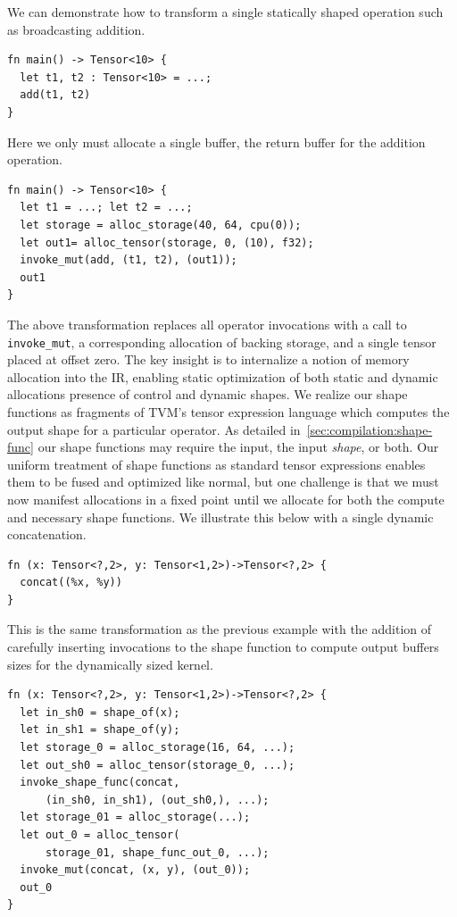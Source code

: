 We can demonstrate how to transform a single statically shaped operation such as broadcasting addition.

\begin{verbatim}
fn main() -> Tensor<10> {
  let t1, t2 : Tensor<10> = ...;
  add(t1, t2)
}
\end{verbatim}

Here we only must allocate a single buffer, the return buffer for the addition operation.

\begin{verbatim}
fn main() -> Tensor<10> {
  let t1 = ...; let t2 = ...;
  let storage = alloc_storage(40, 64, cpu(0));
  let out1= alloc_tensor(storage, 0, (10), f32);
  invoke_mut(add, (t1, t2), (out1));
  out1
}
\end{verbatim}

The above transformation replaces all operator invocations with a call to
  \verb|invoke_mut|, a corresponding allocation of backing storage, and a single
  tensor placed at offset zero.
The key insight is to internalize a notion of memory allocation into the IR,
  enabling static optimization of both static and dynamic allocations presence of
  control and dynamic shapes.
We realize our shape functions as fragments of TVM's tensor expression language
  which computes the output shape for a particular operator.
As detailed in~\autoref{sec:compilation:shape-func} our shape functions
  may require the input, the input \textit{shape}, or both.
Our uniform treatment of shape functions as standard tensor expressions enables them
  to be fused and optimized like normal, but one challenge is that we must now manifest allocations
  in a fixed point until we allocate for both the compute and necessary shape functions.
We illustrate this below with a single dynamic concatenation.

\begin{verbatim}
fn (x: Tensor<?,2>, y: Tensor<1,2>)->Tensor<?,2> {
  concat((%x, %y))
}
\end{verbatim}

This is the same transformation as the previous example with the addition of carefully inserting
invocations to the shape function to compute output buffers sizes for the dynamically sized kernel.

\begin{verbatim}
fn (x: Tensor<?,2>, y: Tensor<1,2>)->Tensor<?,2> {
  let in_sh0 = shape_of(x);
  let in_sh1 = shape_of(y);
  let storage_0 = alloc_storage(16, 64, ...);
  let out_sh0 = alloc_tensor(storage_0, ...);
  invoke_shape_func(concat,
      (in_sh0, in_sh1), (out_sh0,), ...);
  let storage_01 = alloc_storage(...);
  let out_0 = alloc_tensor(
      storage_01, shape_func_out_0, ...);
  invoke_mut(concat, (x, y), (out_0));
  out_0
}
\end{verbatim}

